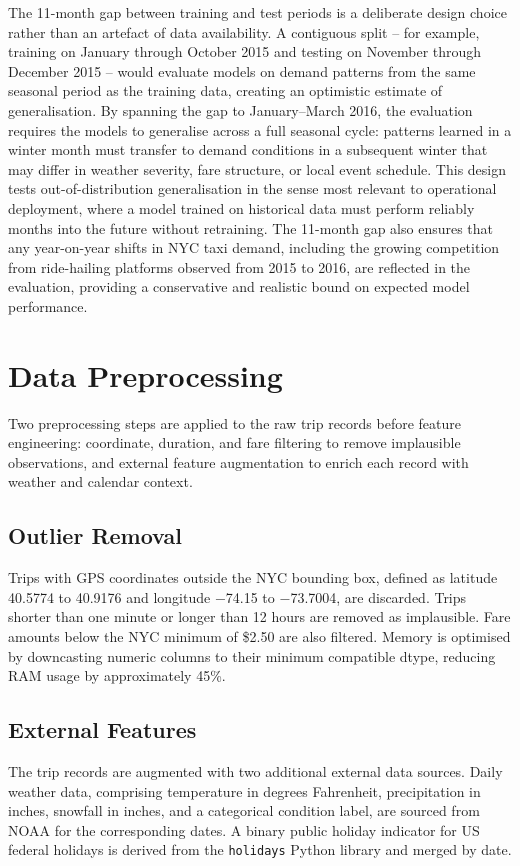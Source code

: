 The 11-month gap between training and test periods is a deliberate design choice rather than an artefact of data availability. A contiguous split -- for example, training on January through October 2015 and testing on November through December 2015 -- would evaluate models on demand patterns from the same seasonal period as the training data, creating an optimistic estimate of generalisation. By spanning the gap to January--March 2016, the evaluation requires the models to generalise across a full seasonal cycle: patterns learned in a winter month must transfer to demand conditions in a subsequent winter that may differ in weather severity, fare structure, or local event schedule. This design tests out-of-distribution generalisation in the sense most relevant to operational deployment, where a model trained on historical data must perform reliably months into the future without retraining. The 11-month gap also ensures that any year-on-year shifts in NYC taxi demand, including the growing competition from ride-hailing platforms observed from 2015 to 2016, are reflected in the evaluation, providing a conservative and realistic bound on expected model performance.

\section{Data Preprocessing}

Two preprocessing steps are applied to the raw trip records before feature engineering: coordinate, duration, and fare filtering to remove implausible observations, and external feature augmentation to enrich each record with weather and calendar context.

\subsection{Outlier Removal}
Trips with GPS coordinates outside the NYC bounding box, defined as latitude 40.5774 to 40.9176 and longitude $-$74.15 to $-$73.7004, are discarded. Trips shorter than one minute or longer than 12 hours are removed as implausible. Fare amounts below the NYC minimum of \$2.50 are also filtered. Memory is optimised by downcasting numeric columns to their minimum compatible dtype, reducing RAM usage by approximately 45\%.

\subsection{External Features}
The trip records are augmented with two additional external data sources. Daily weather data, comprising temperature in degrees Fahrenheit, precipitation in inches, snowfall in inches, and a categorical condition label, are sourced from NOAA for the corresponding dates. A binary public holiday indicator for US federal holidays is derived from the \texttt{holidays} Python library and merged by date.


